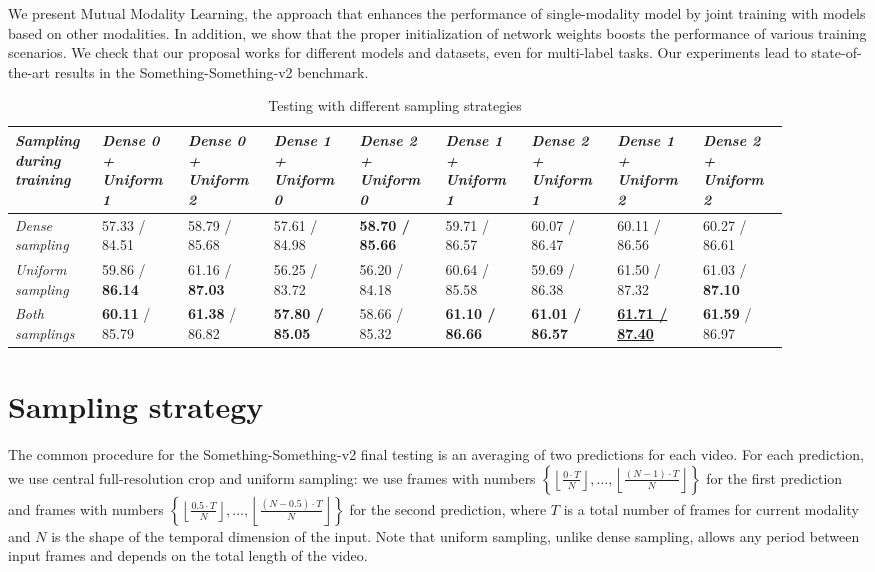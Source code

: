 \documentclass[conference]{IEEEtran}
\begin{document}
We present Mutual Modality Learning, the approach that enhances the performance of single-modality model by joint training with models based on other modalities. In addition, we show that the proper initialization of network weights boosts the performance of various training scenarios. We check that our proposal works for different models and datasets, even for multi-label tasks. Our experiments lead to state-of-the-art results in the Something-Something-v2 benchmark.




\begin{table*}[!h]
	\centering
	\caption{Testing with different sampling strategies}
	\label{tab:sampling}
	\centering
	\begin{tabular}{|p{0.1\linewidth}|p{0.1\linewidth}|p{0.1\linewidth}|p{0.1\linewidth}|p{0.1\linewidth}|p{0.1\linewidth}|p{0.1\linewidth}|p{0.1\linewidth}|p{0.1\linewidth}|} 
		\hline \it Sampling during training & \it Dense 0 + Uniform 1 & \it Dense 0 + Uniform 2 & \it Dense 1 + Uniform 0 & \it Dense 2 + Uniform 0 & \it Dense 1 + Uniform 1 & \it Dense 2 + Uniform 1 & \it Dense 1 + Uniform 2 & \it Dense 2 + Uniform 2 \\ \hline
		\it Dense sampling & 57.33 / 84.51 & 58.79 / 85.68 & 57.61 / 84.98 & \bf 58.70 / 85.66 & 59.71 / 86.57 & 60.07 / 86.47 & 60.11 / 86.56 & 60.27 / 86.61 \\ \hline 
		\it Uniform sampling & 59.86 / \textbf{86.14} & 61.16 / \textbf{87.03} & 56.25 / 83.72 & 56.20 / 84.18 & 60.64 / 85.58 & 59.69 / 86.38 & 61.50 / 87.32 & 61.03 / \textbf{87.10} \\ \hline 
		\it Both samplings & \textbf{60.11} / 85.79 & \textbf{61.38} / 86.82 & \bf 57.80 / 85.05 & 58.66 / 85.32 & \bf 61.10 / 86.66 & \bf 61.01 / 86.57 & \bf \underline{61.71 / 87.40} & \textbf{61.59} / 86.97 \\ \hline 	
	\end{tabular}
\end{table*}

\newpage

\appendices

\section{Sampling strategy} \label{app:a}

The common procedure for the Something-Something-v2 final testing is an averaging of two predictions for each video. For each prediction, we use central full-resolution crop and uniform sampling: we use frames with numbers $\left\{\left\lfloor\frac{0\cdot T}{N}\right\rfloor,\ldots,\left\lfloor\frac{(N-1)\cdot T}{N}\right\rfloor\right\}$ for the first prediction and frames with numbers $\left\{\left\lfloor\frac{0.5\cdot T}{N}\right\rfloor,\ldots,\left\lfloor\frac{(N-0.5)\cdot T}{N}\right\rfloor\right\}$ for the second prediction, where $T$ is a total number of frames for current modality and $N$ is the shape of the temporal dimension of the input. Note that uniform sampling, unlike dense sampling, allows any period between input frames and depends on the total length of the video.
\end{document}
